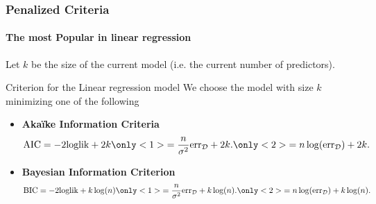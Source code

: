 \documentclass[10pt, c, xcolor=x11names]{beamer}\usepackage[]{graphicx}\usepackage[]{color}
\begin{document}
\begin{frame}
  \frametitle{Penalized Criteria}
  \framesubtitle{The most Popular in linear regression}

    Let $k$ be the size of the current model (i.e. the current number of predictors).
    
    \vfill

    \begin{block}{Criterion for the Linear regression model
        }
      We choose  the model with size  $k$ minimizing one of the following
      \begin{itemize}
    \item      \alert{\bf      Aka\"ike     Information      Criteria}
       
      \[ 
      \mathrm{AIC} = - 2 \mathrm{loglik} + 2 k
      \only<1>{ = \frac{n}{\sigma^2} \mathrm{err}_{\mathcal{D}} + 2 k .}
      \only<2>{ = n \log(\mathrm{err}_{\mathcal{D}}) + 2 k .}
      \]
      
    \item \alert{\bf Bayesian Information Criterion} 
      \[ 
      \mathrm{BIC} = - 2 \mathrm{loglik} + k \log(n)
      \only<1>{ = \frac{n}{\sigma^2} \mathrm{err}_{\mathcal{D}} + k \log(n) .}
      \only<2>{ = n \log(\mathrm{err}_{\mathcal{D}}) + k \log(n) .}
      \]
    \end{itemize}
    \end{block}
  
\end{frame}
\end{document}
